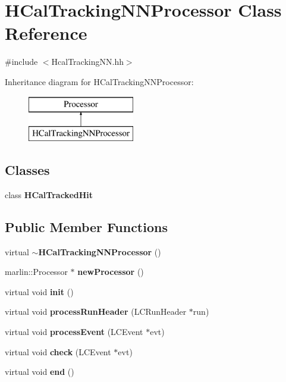 \section{H\-Cal\-Tracking\-N\-N\-Processor Class Reference}
\label{classHCalTrackingNNProcessor}


{\ttfamily \#include $<$Hcal\-Tracking\-N\-N.\-hh$>$}

Inheritance diagram for H\-Cal\-Tracking\-N\-N\-Processor\-:\begin{figure}[H]
\begin{center}
\leavevmode
\includegraphics[height=2.000000cm]{classHCalTrackingNNProcessor}
\end{center}
\end{figure}
\subsection*{Classes}
\begin{DoxyCompactItemize}
\item 
class {\bf H\-Cal\-Tracked\-Hit}
\end{DoxyCompactItemize}
\subsection*{Public Member Functions}
\begin{DoxyCompactItemize}
\item 
virtual {\bf $\sim$\-H\-Cal\-Tracking\-N\-N\-Processor} ()
\item 
marlin\-::\-Processor $\ast$ {\bfseries new\-Processor} ()\label{classHCalTrackingNNProcessor_aac4d06e41720579d7f24c0c3835c4519}

\item 
virtual void {\bf init} ()
\item 
virtual void {\bf process\-Run\-Header} (L\-C\-Run\-Header $\ast$run)
\item 
virtual void {\bf process\-Event} (L\-C\-Event $\ast$evt)
\item 
virtual void {\bfseries check} (L\-C\-Event $\ast$evt)\label{classHCalTrackingNNProcessor_a5c6e5cb2aa8ce74d13815641f4d3c0ca}

\item 
virtual void {\bf end} ()
\end{DoxyCompactItemize}
